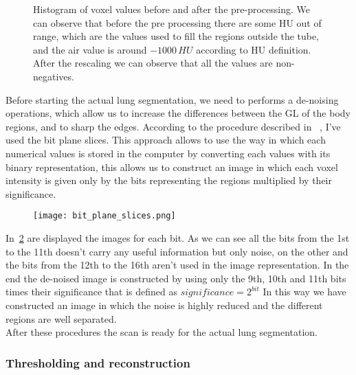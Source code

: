 \documentclass{standalone}
\begin{document}
	\begin{figure}[h]\label{fig:Pre-Processing}
		\centering
		\caption{Histogram of voxel values before and after the pre-processing. We can observe that before the pre processing there are some HU out of range, which are the values used to fill the regions outside the tube, and the air value is around $-1000\,HU$ according to HU definition. After the rescaling we can observe that all the values are non-negatives.}
	\end{figure}
	
	
	
	Before starting the actual lung segmentation, we need to performs a de-noising operations, which allow us to increase the differences between the GL of the body regions, and to sharp the edges. According to the procedure described in ~\cite{ART:Abdullah}, I've used the bit plane slices. This approach allows to use the way in which each numerical values is stored in the computer by converting  each values with its binary representation, this allows us to construct an image in which each voxel intensity is given only by the bits representing the regions multiplied by their significance.
	
	\begin{figure}[h]\label{fig:BinaryRepr}
		\centering
			\texttt{[image: bit\_plane\_slices.png]}
		\caption{}
	\end{figure}

	In \figurename\,\ref{fig:BinaryRepr} are displayed the images for each bit. As we can see all the bits from the 1st to the 11th doesn't carry any useful information but only noise, on the other and the bits from the 12th to the 16th aren't used in the image representation. In the end the de-noised image is constructed by using only the 9th, 10th and 11th bits times their significance that is defined as $significance = 2^{bit}$
	In this way we have constructed an image in which the noise is highly reduced and the different regions are well separated.\\
	After these procedures the scan is ready for the actual lung segmentation.
	
	

	\subsubsection*{Thresholding and reconstruction}
	
\end{document}
